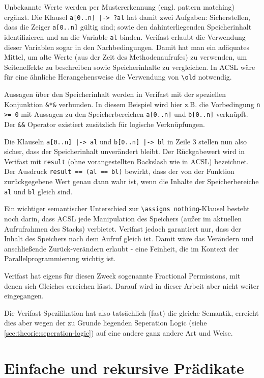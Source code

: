 Unbekannte Werte werden per Mustererkennung (engl. pattern matching) ergänzt. Die Klausel
\lstinline{a[0..n] |-> ?al} hat damit zwei Aufgaben: Sicherstellen, dass die Zeiger \lstinline{a[0..n]}
gültig sind; sowie den dahinterliegenden Speicherinhalt identifizieren und an die Variable \lstinline{al}
binden. Verifast erlaubt die Verwendung dieser Variablen sogar in den Nachbedingungen. Damit hat man ein 
adäquates Mittel, um alte Werte (aus der Zeit des Methodenaufrufes) zu verwenden, um Seiteneffekte zu
beschreiben sowie Speicherinhalte zu vergleichen. In ACSL wäre für eine ähnliche Herangehensweise
die Verwendung von \lstinline{\old} notwendig.

Aussagen über den Speicherinhalt werden in Verifast mit der speziellen Konjunktion \lstinline{&*&} 
verbunden. In diesem Beispiel wird hier z.B. die Vorbedingung \lstinline{n >= 0} mit Aussagen zu den 
Speicherbereichen \lstinline{a[0..n]} und \lstinline{b[0..n]} verknüpft. Der \lstinline{&&} Operator 
existiert zusätzlich für logische Verknüpfungen.

Die Klauseln \lstinline{a[0..n] |-> al} und \lstinline{b[0..n] |-> bl} in Zeile 3 stellen nun also sicher, 
dass der Speicherinhalt unverändert bleibt. Der Rückgabewert wird in Verifast mit \lstinline{result} 
(ohne vorangestellten Backslash wie in ACSL) bezeichnet. Der Ausdruck \lstinline{result == (al == bl)} 
bewirkt, dass der von der Funktion zurückgegebene Wert genau dann wahr ist, wenn die Inhalte der 
Speicherbereiche \lstinline{al} und \lstinline{bl} gleich sind.

Ein wichtiger semantischer Unterschied zur \lstinline{\assigns nothing}-Klausel besteht noch darin, 
dass ACSL jede Manipulation des Speichers (außer im aktuellen Aufrufrahmen des Stacks) verbietet. 
Verifast jedoch garantiert nur, dass der Inhalt des Speichers nach dem Aufruf gleich ist. Damit wäre 
das Verändern und anschließende Zurück-verändern erlaubt - eine Feinheit, die im Kontext der
Parallelprogrammierung wichtig ist.

Verifast hat eigens für diesen Zweck sogenannte Fractional Permissions, mit denen sich Gleiches
erreichen lässt. Darauf wird in dieser Arbeit aber nicht weiter eingegangen.

Die Verifast-Spezifikation hat also tatsächlich (fast) die gleiche Semantik, erreicht dies aber wegen der 
zu Grunde liegenden Seperation Logic (siehe \ref{sec:theorie:seperation-logic}) auf eine andere ganz 
andere Art und Weise.

\section{Einfache und rekursive Prädikate}
\label{sec:design-by-contract:predicates}

